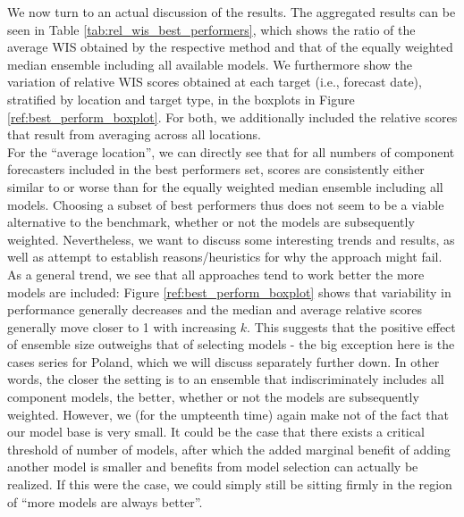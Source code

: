 We now turn to an actual discussion of the results. The aggregated results can be seen in Table \ref{tab:rel_wis_best_performers}, which shows the ratio of the average WIS obtained by the respective method and that of the equally weighted median ensemble including all available models. We furthermore show the variation of relative WIS scores obtained at each target (i.e., forecast date), stratified by location and target type, in the boxplots in Figure \ref{ref:best_perform_boxplot}. For both, we additionally included the relative scores that result from averaging across all locations.\\
For the ``average location'', we can directly see that for all numbers of component forecasters included in the best performers set, scores are consistently either similar to or worse than for the equally weighted median ensemble including all models. Choosing a subset of best performers thus does not seem to be a viable alternative to the benchmark, whether or not the models are subsequently weighted. Nevertheless, we want to discuss some interesting trends and results, as well as attempt to establish reasons/heuristics for why the approach might fail.\\
As a general trend, we see that all approaches tend to work better the more models are included: Figure \ref{ref:best_perform_boxplot} shows that variability in performance generally decreases and the median and average relative scores generally move closer to 1 with increasing $k$. This suggests that the positive effect of ensemble size outweighs that of selecting models - the big exception here is the cases series for Poland, which we will discuss separately further down. In other words, the closer the setting is to an ensemble that indiscriminately includes all component models, the better, whether or not the models are subsequently weighted. However, we (for the umpteenth time) again make not of the fact that our model base is very small. It could be the case that there exists a critical threshold of number of models, after which the added marginal benefit of adding another model is smaller and benefits from model selection can actually be realized. If this were the case, we could simply still be sitting firmly in the region of ``more models are always better''.\\
